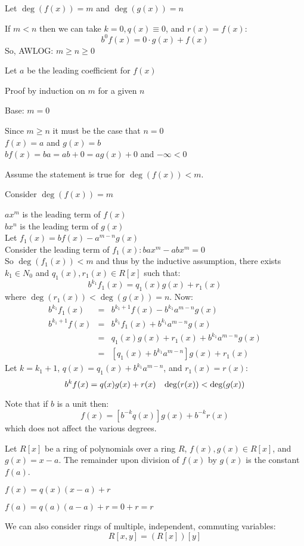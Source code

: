 \documentclass[letterpaper,12pt,fleqn]{article}
\begin{document}
\begin{theproof}
  Let $\deg(f(x))=m$ and $\deg(g(x))=n$
  
  If $m<n$ then we can take $k=0, q(x)\equiv0$, and $r(x)=f(x)$:
  \[b^0f(x)=0\cdot g(x)+f(x)\]
  So, AWLOG: $m\ge n\ge 0$

  Let $a$ be the leading coefficient for $f(x)$

  Proof by induction on $m$ for a given $n$
  \begin{description}
  \item Base: $m=0$

    Since $m\ge n$ it must be the case that $n=0$ \\
    $f(x)=a$ and $g(x)=b$ \\
    $bf(x)=ba=ab+0=ag(x)+0$ and $-\infty<0$

  \item Assume the statement is true for $\deg(f(x))<m$.

  \item Consider $\deg(f(x))=m$

    $ax^m$ is the leading term of $f(x)$ \\
    $bx^n$ is the leading term of $g(x)$ \\
    Let $f_1(x)=bf(x)-a^{m-n}g(x)$ \\
    Consider the leading term of $f_1(x): bax^m-abx^m=0$ \\
    So $\deg(f_1(x))<m$ and thus by the inductive assumption, there exists
    $k_1\in N_0$ and $q_1(x),r_1(x)\in R[x]$ such that:
    \[b^{k_1}f_1(x)=q_1(x)g(x)+r_1(x)\]
    where $\deg(r_1(x))<\deg(g(x))=n$. Now:
    \begin{eqnarray*}
      b^{k_1}f_1(x) &=& b^{k_1+1}f(x)-b^{k_1}a^{m-n}g(x) \\
      b^{k_1+1}f(x) &=& b^{k_1}f_1(x)+b^{k_1}a^{m-n}g(x) \\
      &=& q_1(x)g(x)+r_1(x)+b^{k_1}a^{m-n}g(x) \\
      &=& [q_1(x)+b^{k_1}a^{m-n}]g(x)+r_1(x)
    \end{eqnarray*}
    Let $k=k_1+1$, $q(x)=q_1(x)+b^{k_1}a^{m-n}$, and $r_1(x)=r(x)$:
    \[b^kf(x)=q(x)g(x)+r(x)\hspace{2ex}\deg(r(x))<\deg(g(x))\]
  \end{description}
\end{theproof}

Note that if $b$ is a unit then:
\[f(x)=[b^{-k}q(x)]g(x)+b^{-k}r(x)\]
which does not affect the various degrees.

\begin{corollary}
  Let $R[x]$ be a ring of polynomials over a ring $R$, $f(x),g(x)\in R[x]$, and
  $g(x)=x-a$. The remainder upon division of $f(x)$ by $g(x)$ is the constant $f(a)$.
\end{corollary}

\begin{theproof}
  $f(x)=q(x)(x-a)+r$
  
  $f(a)=q(a)(a-a)+r=0+r=r$
\end{theproof}

We can also consider rings of multiple, independent, commuting variables:
\[R[x,y]=(R[x])[y]\]
\end{document}
